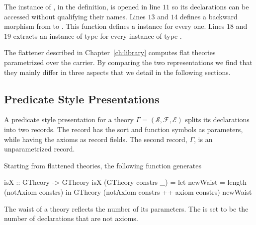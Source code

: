 \noindent The instance of , in the  definition, is opened in line $11$ so its declarations can be accessed without qualifying their names. 
Lines $13$ and $14$ defines a backward morphism from  to . This  function defines a  instance for every  one. 
Lines $18$ and $19$ extracts an instance of type  for every instance of type . 

The flattener described in Chapter~\ref{ch:library} computes flat theories parametrized over the carrier. By comparing the two representations we find that they mainly differ in three aspects that we detail in the following sections. 
\subsection{Predicate Style Presentations}
A predicate style presentation for a theory $\Gamma = (\mathcal{S},\mathcal{F}, \mathcal{E})$ splits its declarations into two records. The  record has the sort and function symbols as parameters, while having the axioms as record fields. The second record, $\Gamma$, is an unparametrized record. 

Starting from flattened theories, the following function generates  
\begin{hscode}
isX :: GTheory -> GTheory
isX (GTheory constrs _) =
  let newWaist = length (notAxiom constrs) 
  in GTheory (notAxiom constrs ++ axiom constrs) newWaist
\end{hscode}
\noindent The waist of a theory reflects the number of its parameters. The  is set to be the number of declarations that are not axioms. 

